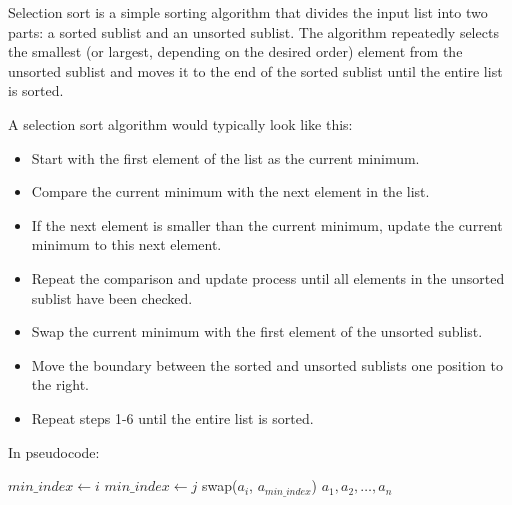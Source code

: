 \begin{definition}
    Selection sort is a simple sorting algorithm that divides the input list into two parts: a sorted sublist and an unsorted sublist. The algorithm repeatedly selects the smallest (or largest, depending on the desired order) element from the unsorted sublist and moves it to the end of the sorted sublist until the entire list is sorted.
\end{definition}
\begin{eg}
    A selection sort algorithm would typically look like this:
    \begin{itemize}[itemsep=1pt,label=$\circ$]
        \item Start with the first element of the list as the current minimum.
        \item Compare the current minimum with the next element in the list.
        \item If the next element is smaller than the current minimum, update the current minimum to this next element.
        \item Repeat the comparison and update process until all elements in the unsorted sublist have been checked.
        \item Swap the current minimum with the first element of the unsorted sublist.
        \item Move the boundary between the sorted and unsorted sublists one position to the right.
        \item Repeat steps 1-6 until the entire list is sorted.
    \end{itemize}
    In pseudocode:
    \begin{algorithmic}
                \State $min\_index \gets i$
                        \State $min\_index \gets j$
                    \EndIf
                \EndFor
                \State swap($a_i$, $a_{min\_index}$)
            \EndFor
            \State \Return $a_1, a_2, \ldots, a_n$
        \EndFunction
    \end{algorithmic}
\end{eg}
